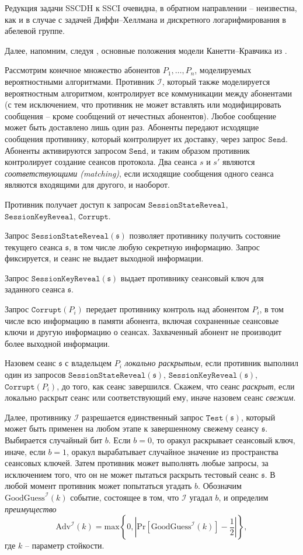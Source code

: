\documentclass[a4paper,12pt]{article}
\theoremstyle{definition}
\begin{document}
Редукция задачи SSCDH к SSCI очевидна, в обратном направлении -- неизвестна, как и в случае с задачей Диффи--Хеллмана и дискретного логарифмирования в абелевой группе.

Далее, напомним, следуя \cite{DF}, основные положения модели Канетти--Кравчика из \cite{CK}.

Рассмотрим конечное множество абонентов $P_1,\dots,P_n$, моделируемых вероятностными алгоритмами. Противник $\mathcal{I}$, который также моделируется вероятностным алгоритмом,
контролирует все коммуникации между абонентами (с тем исключением, что противник не может вставлять или модифицировать сообщения -- кроме сообщений от нечестных абонентов).
Любое сообщение может быть доставлено лишь один раз. Абоненты передают исходящие сообщения противнику, который контролирует их доставку, через запрос $\mathtt{Send}$. Абоненты
активируются запросом $\mathtt{Send}$, и таким образом противник контролирует создание сеансов протокола. Два сеанса $s$ и $s'$ являются \emph{соответствующими (matching)}, если
исходящие сообщения одного сеанса являются входящими для другого, и наоборот.

Противник получает доступ к запросам $\mathtt{SessionStateReveal}$, $\mathtt{SessionKeyReveal}$, $\mathtt{Corrupt}$. 

Запрос $\mathtt{SessionStateReveal}(\mathfrak{s})$ позволяет противнику получить состояние текущего сеанса $\mathfrak{s}$, в том числе любую секретную информацию. Запрос фиксируется, и сеанс 
не выдает выходной информации.

Запрос  $\mathtt{SessionKeyReveal}(\mathfrak{s})$ выдает противнику сеансовый ключ для заданного сеанса $\mathfrak{s}$.

Запрос $\mathtt{Corrupt}(P_i)$ передает противнику контроль над абонентом $P_i$, в том числе всю информацию в памяти абонента, включая сохраненные сеансовые ключи и другую информацию о сеансах. Захваченный абонент не производит более выходной информации.

Назовем сеанс $\mathfrak{s}$  с владельцем $P_i$ \emph{локально раскрытым}, если противник выполнил один из запросов $\mathtt{SessionStateReveal}(\mathfrak{s})$, $\mathtt{SessionKeyReveal}(\mathfrak{s})$, $\mathtt{Corrupt}(P_i)$, до того, как сеанс завершился. Скажем, что сеанс \emph{раскрыт}, если локально раскрыт сеанс или соответствующий ему, иначе назовем сеанс \emph{свежим}.

Далее, противнику $\mathcal{I}$ разрешается единственный запрос $\mathtt{Test}(\mathfrak{s})$, который может быть применен на любом этапе к завершенному свежему сеансу $\mathfrak{s}$.
Выбирается случайный бит $b$. Если $b=0$, то оракул раскрывает сеансовый ключ, иначе, если $b=1$, оракул вырабатывает случайное значение из пространства сеансовых ключей. Затем противник может выполнять любые запросы, за исключением того, что он не может пытаться раскрыть тестовый сеанс $\mathfrak{s}$. В любой момент противник может попытаться угадать $b$. Обозначим
$\mathrm{GoodGuess}^{\mathcal{I}}(k)$ событие, состоящее в том, что $\mathcal{I}$ угадал $b$, и определим \emph{преимущество}
$$
\mathrm{Adv}^{\mathcal{I}}(k)=\mathrm{max}\left\{0,\left|\mathrm{Pr}[\mathrm{GoodGuess}^{\mathcal{I}}(k)]-\frac{1}{2}\right|\right\},
$$
где $k$ -- параметр стойкости.
\end{document}
